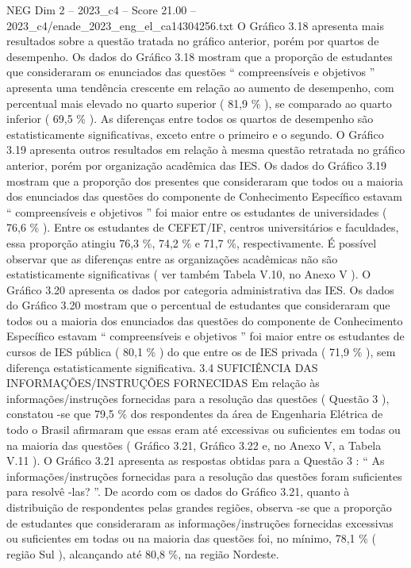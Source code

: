 \begin{textsample}{NEG Dim 2 – 2023\_c4 – Score 21.00 – 2023\_c4/enade\_2023\_eng\_el\_ca14304256.txt}
O Gráfico 3.18 apresenta mais resultados sobre a questão tratada no gráfico anterior, porém por quartos de desempenho.
Os dados do Gráfico 3.18 mostram que a proporção de estudantes que consideraram os enunciados das questões “ compreensíveis e objetivos ” apresenta uma tendência crescente em relação ao aumento de desempenho, com percentual mais elevado no quarto superior ( 81,9 \% ), se comparado ao quarto inferior ( 69,5 \% ).
As diferenças entre todos os quartos de desempenho são estatisticamente significativas, exceto entre o primeiro e o segundo.
O Gráfico 3.19 apresenta outros resultados em relação à mesma questão retratada no gráfico anterior, porém por organização acadêmica das IES.
Os dados do Gráfico 3.19 mostram que a proporção dos presentes que consideraram que todos ou a maioria dos enunciados das questões do componente de Conhecimento Específico estavam “ compreensíveis e objetivos ” foi maior entre os estudantes de universidades ( 76,6 \% ).
Entre os estudantes de CEFET/IF, centros universitários e faculdades, essa proporção atingiu 76,3 \%, 74,2 \% e 71,7 \%, respectivamente.
É possível observar que as diferenças entre as organizações acadêmicas não são estatisticamente significativas ( ver também Tabela V.10, no Anexo V ).
O Gráfico 3.20 apresenta os dados por categoria administrativa das IES.
Os dados do Gráfico 3.20 mostram que o percentual de estudantes que consideraram que todos ou a maioria dos enunciados das questões do componente de Conhecimento Específico estavam “ compreensíveis e objetivos ” foi maior entre os estudantes de cursos de IES pública ( 80,1 \% ) do que entre os de IES privada ( 71,9 \% ), sem diferença estatisticamente significativa. 3.4 SUFICIÊNCIA DAS INFORMAÇÕES/INSTRUÇÕES FORNECIDAS Em relação às informações/instruções fornecidas para a resolução das questões ( Questão 3 ), constatou -se que 79,5 \% dos respondentes da área de Engenharia Elétrica de todo o Brasil afirmaram que essas eram até excessivas ou suficientes em todas ou na maioria das questões ( Gráfico 3.21, Gráfico 3.22 e, no Anexo V, a Tabela V.11 ).
O Gráfico 3.21 apresenta as respostas obtidas para a Questão 3 : “ As informações/instruções fornecidas para a resolução das questões foram suficientes para resolvê -las? ”.
De acordo com os dados do Gráfico 3.21, quanto à distribuição de respondentes pelas grandes regiões, observa -se que a proporção de estudantes que consideraram as informações/instruções fornecidas excessivas ou suficientes em todas ou na maioria das questões foi, no mínimo, 78,1 \% ( região Sul ), alcançando até 80,8 \%, na região Nordeste.

\end{textsample}

